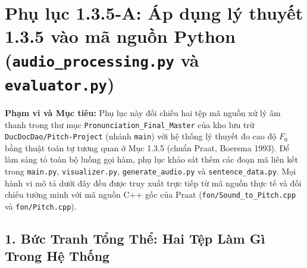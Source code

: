 \documentclass[11pt,a4paper]{article}
\begin{document}
\newpage
\section*{Phụ lục 1.3.5-A: Áp dụng lý thuyết 1.3.5 vào mã nguồn Python\\(\texttt{audio\_processing.py} và \texttt{evaluator.py})}

\begin{learningobj}
\textbf{Phạm vi và Mục tiêu:} Phụ lục này đối chiếu hai tệp mã nguồn xử lý âm thanh trong thư mục \texttt{Pronunciation\_Final\_Master} của kho lưu trữ \texttt{DucDocDao/Pitch-Project} (nhánh \texttt{main}) với hệ thống lý thuyết đo cao độ $F_0$ bằng thuật toán tự tương quan ở Mục 1.3.5 (chuẩn Praat, Boersma 1993). Để làm sáng tỏ toàn bộ luồng gọi hàm, phụ lục khảo sát thêm các đoạn mã liên kết trong \texttt{main.py}, \texttt{visualizer.py}, \texttt{generate\_audio.py} và \texttt{sentence\_data.py}. Mọi hành vi mô tả dưới đây đều được truy xuất trực tiếp từ mã nguồn thực tế và đối chiếu tường minh với mã nguồn C++ gốc của Praat (\texttt{fon/Sound\_to\_Pitch.cpp} và \texttt{fon/Pitch.cpp}).
\end{learningobj}

\subsection*{1. Bức Tranh Tổng Thể: Hai Tệp Làm Gì Trong Hệ Thống}
\end{document}
